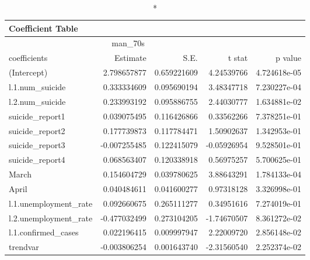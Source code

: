 \begin{longtable}{lrrrr}
\caption*{
{\large Coefficient Table}
} \\ 
\toprule
\multicolumn{4}{c}{man\_70s} &  \\ 
\cmidrule(lr){1-4}
coefficients & Estimate & S.E. & t stat & p value \\ 
\midrule\addlinespace[2.5pt]
(Intercept) & 2.798657877 & 0.659221609 & 4.24539766 & 4.724618e-05 \\ 
l.1.num\_suicide & 0.333334609 & 0.095690194 & 3.48347718 & 7.230227e-04 \\ 
l.2.num\_suicide & 0.233993192 & 0.095886755 & 2.44030777 & 1.634881e-02 \\ 
suicide\_report1 & 0.039075495 & 0.116426866 & 0.33562266 & 7.378251e-01 \\ 
suicide\_report2 & 0.177739873 & 0.117784471 & 1.50902637 & 1.342953e-01 \\ 
suicide\_report3 & -0.007255485 & 0.122415079 & -0.05926954 & 9.528501e-01 \\ 
suicide\_report4 & 0.068563407 & 0.120338918 & 0.56975257 & 5.700625e-01 \\ 
March & 0.154604729 & 0.039780625 & 3.88643291 & 1.784133e-04 \\ 
April & 0.040484611 & 0.041600277 & 0.97318128 & 3.326998e-01 \\ 
l.1.unemployment\_rate & 0.092660675 & 0.265111277 & 0.34951616 & 7.274019e-01 \\ 
l.2.unemployment\_rate & -0.477032499 & 0.273104205 & -1.74670507 & 8.361272e-02 \\ 
l.1.confirmed\_cases & 0.022196415 & 0.009997947 & 2.22009720 & 2.856148e-02 \\ 
trendvar & -0.003806254 & 0.001643740 & -2.31560540 & 2.252374e-02 \\ 
\bottomrule
\end{longtable}

